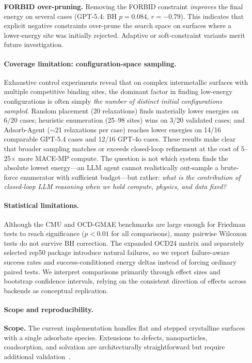 \textbf{FORBID over-pruning.}
Removing the FORBID constraint \textit{improves} the final energy on several cases (GPT-5.4: BH $p = 0.084$, $r = -0.79$).
This indicates that explicit negative constraints over-prune the search space on surfaces where a lower-energy site was initially rejected.
Adaptive or soft-constraint variants merit future investigation.

\paragraph{Coverage limitation: configuration-space sampling.}
Exhaustive control experiments reveal that on complex intermetallic surfaces with multiple competitive binding sites, the dominant factor in finding low-energy configurations is often simply \textit{the number of distinct initial configurations sampled}.
Random placement (20 relaxations) finds materially lower energies on 6/20 cases; heuristic enumeration (25--98 sites) wins on 3/20 validated cases; and Adsorb-Agent ($\sim$21 relaxations per case) reaches lower energies on 14/16 comparable GPT-5.4 cases and 12/16 GPT-4o cases.
These results make clear that broader sampling matches or exceeds closed-loop refinement at the cost of 5--25$\times$ more MACE-MP compute.
The question is not which system finds the absolute lowest energy---an LLM agent cannot realistically out-sample a brute-force enumerator with sufficient budget---but rather: \textit{what is the contribution of closed-loop LLM reasoning when we hold compute, physics, and data fixed?}

\paragraph{Statistical limitations.}
Although the CMU and OCD-GMAE benchmarks are large enough for Friedman tests to reach significance ($p < 0.01$ for all comparisons), many pairwise Wilcoxon tests do not survive BH correction.
The expanded OCD24 matrix and separately selected rep50 package introduce natural failures, so we report failure-aware success rates and success-conditioned energy deltas instead of forcing ordinary paired tests.
We interpret comparisons primarily through effect sizes and bootstrap confidence intervals, relying on the consistent direction of effects across backends as conceptual replication.

\paragraph{Scope and reproducibility.}
\textbf{Scope.}
The current implementation handles flat and stepped crystalline surfaces with a single adsorbate species.
Extensions to defects, nanoparticles, coadsorption, and solvation are architecturally straightforward but require additional validation~\cite{yang2026quasar,zhang2026towards}.

